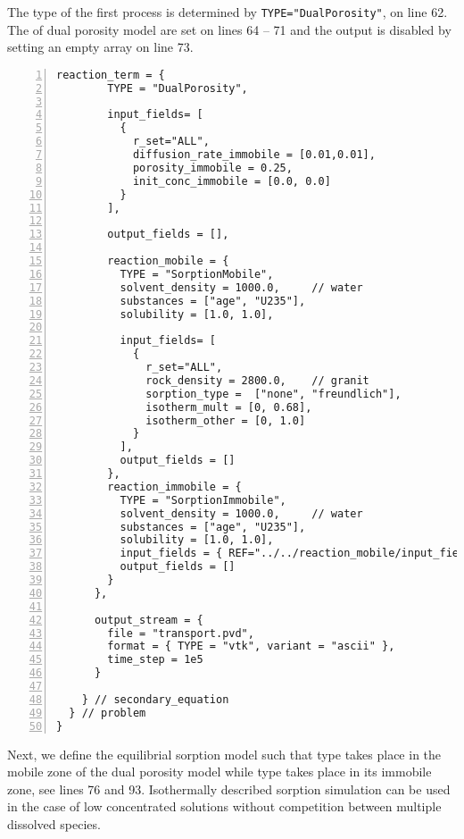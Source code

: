 The type of the first process is determined by {\tt TYPE="DualPorosity"}, on line 62. 
The 
of dual porosity model are set on lines 64 -- 71 and the output is disabled by setting an empty array on line 73.

\begin{Verbatim}[numbers=left, firstnumber=last]
      reaction_term = {
        TYPE = "DualPorosity",
        
        input_fields= [
          {
            r_set="ALL",
            diffusion_rate_immobile = [0.01,0.01],
            porosity_immobile = 0.25,
            init_conc_immobile = [0.0, 0.0]
          }
        ],
        
        output_fields = [],
        
        reaction_mobile = {
          TYPE = "SorptionMobile",
          solvent_density = 1000.0,     // water
          substances = ["age", "U235"],
          solubility = [1.0, 1.0],
          
          input_fields= [
            {
              r_set="ALL",
              rock_density = 2800.0,    // granit
              sorption_type =  ["none", "freundlich"],
              isotherm_mult = [0, 0.68], 
              isotherm_other = [0, 1.0]
            }
          ],
          output_fields = []
        },
        reaction_immobile = {
          TYPE = "SorptionImmobile",
          solvent_density = 1000.0,     // water
          substances = ["age", "U235"],
          solubility = [1.0, 1.0],
          input_fields = { REF="../../reaction_mobile/input_fields" },
          output_fields = []
        }
      },
      
      output_stream = { 
        file = "transport.pvd", 
        format = { TYPE = "vtk", variant = "ascii" },
        time_step = 1e5      
      } 

    } // secondary_equation
  } // problem
}
\end{Verbatim}

Next, we define the equilibrial sorption model such that  type takes place in the mobile 
zone of the dual porosity model while  type takes place in its immobile zone, see lines 76 and 93.
Isothermally described sorption simulation can be used in the case of low concentrated solutions without competition between multiple dissolved species.

